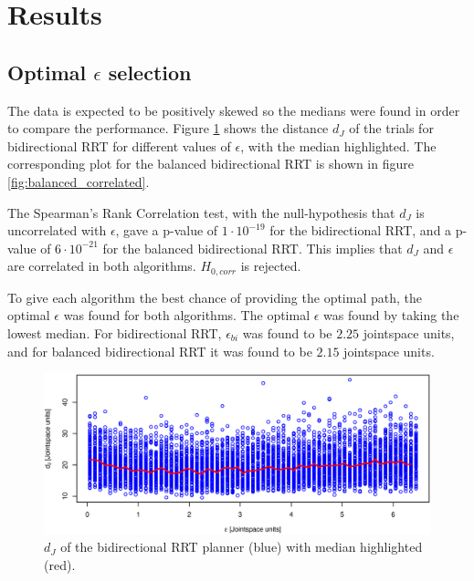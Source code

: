 \section{Results} 
\subsection{Optimal \(\epsilon\) selection}
The data is expected to be positively skewed
so the medians were found in order to compare the performance.
Figure \ref{fig:bidir_correlated} shows the distance \(d_J\) of the trials
for bidirectional RRT for different values of \(\epsilon\), with the median highlighted.
The corresponding plot for the
balanced bidirectional RRT is shown in figure \ref{fig:balanced_correlated}.

The Spearman's Rank Correlation test,
with the null-hypothesis that \(d_J\) is uncorrelated with \(\epsilon\),
gave a p-value of \(1\cdot 10^{-19}\) for the bidirectional RRT,
and a p-value of \(6\cdot 10^{-21}\) for the balanced bidirectional RRT.
This implies that \(d_J\) and \(\epsilon\) are correlated in both algorithms.
\(H_{0,corr}\) is rejected.

To give each algorithm the best chance of providing the optimal path,
the optimal \(\epsilon\) was found for both algorithms.
The optimal \(\epsilon\) was found by taking the lowest median.
For bidirectional RRT, \(\epsilon_{bi}\) was found to be \(2.25\) jointspace units,
and for balanced bidirectional RRT it was found to be \(2.15\) jointspace units.

\begin{figure}[h]
 \centering
 \includegraphics[width=\figsize]{graphics/bidirectional_correlation}
 \caption{\(d_J\) of the bidirectional RRT planner (blue) with median highlighted (red).}
 \label{fig:bidir_correlated}
\end{figure}

